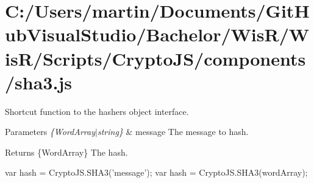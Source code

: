 \hypertarget{_c_1_2_users_2martin_2_documents_2_git_hub_visual_studio_2_bachelor_2_wis_r_2_wis_r_2_scripts_2_4d70dcb797b3afba08404acc55f6e40f}{}\section{C\+:/\+Users/martin/\+Documents/\+Git\+Hub\+Visual\+Studio/\+Bachelor/\+Wis\+R/\+Wis\+R/\+Scripts/\+Crypto\+J\+S/components/sha3.\+js}
Shortcut function to the hasher\textquotesingle{}s object interface.


\begin{DoxyParams}{Parameters}
{\em \{\+Word\+Array$\vert$string\}} & message The message to hash.\\
\hline
\end{DoxyParams}
\begin{DoxyReturn}{Returns}
\{Word\+Array\} The hash.
\end{DoxyReturn}
\begin{DoxyVerb}var hash = CryptoJS.SHA3('message');
var hash = CryptoJS.SHA3(wordArray);\end{DoxyVerb}



